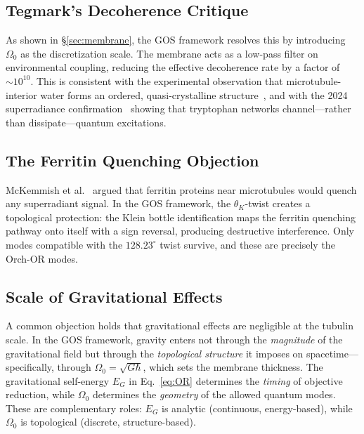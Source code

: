 \documentclass[12pt,a4paper]{article}
\theoremstyle{plain}
\theoremstyle{definition}
\newcommand{\OmegaZero}{\Omega_0}
\newcommand{\thetaK}{\theta_K}
\newcommand{\EG}{E_G}
\begin{document}
\subsection{Tegmark's Decoherence Critique}

As shown in \S\ref{sec:membrane}, the GOS framework resolves this by introducing $\OmegaZero$ as the discretization scale. The membrane acts as a low-pass filter on environmental coupling, reducing the effective decoherence rate by a factor of $\sim 10^{10}$. This is consistent with the experimental observation that microtubule-interior water forms an ordered, quasi-crystalline structure~\cite{tuszynski2004}, and with the 2024 superradiance confirmation~\cite{babcock2024} showing that tryptophan networks channel---rather than dissipate---quantum excitations.

\subsection{The Ferritin Quenching Objection}

McKemmish et al.~\cite{mckemmish2009} argued that ferritin proteins near microtubules would quench any superradiant signal. In the GOS framework, the $\thetaK$-twist creates a topological protection: the Klein bottle identification maps the ferritin quenching pathway onto itself with a sign reversal, producing destructive interference. Only modes compatible with the $128.23^\circ$ twist survive, and these are precisely the Orch-OR modes.

\subsection{Scale of Gravitational Effects}

A common objection holds that gravitational effects are negligible at the tubulin scale. In the GOS framework, gravity enters not through the \emph{magnitude} of the gravitational field but through the \emph{topological structure} it imposes on spacetime---specifically, through $\OmegaZero = \sqrt{G\hbar}$, which sets the membrane thickness. The gravitational self-energy $\EG$ in Eq.~\ref{eq:OR} determines the \emph{timing} of objective reduction, while $\OmegaZero$ determines the \emph{geometry} of the allowed quantum modes. These are complementary roles: $\EG$ is analytic (continuous, energy-based), while $\OmegaZero$ is topological (discrete, structure-based).

\end{document}
